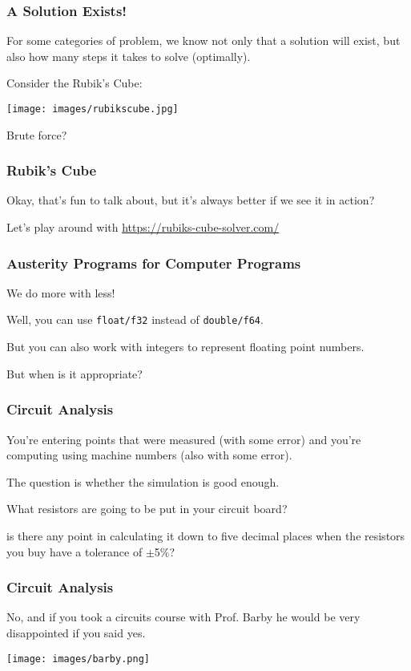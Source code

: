 \begin{frame}
\frametitle{A Solution Exists!}

For some categories of problem, we know not only that a solution will exist, but also how many steps it takes to solve (optimally). 

Consider the Rubik's Cube:

\begin{center}
	\texttt{[image: images/rubikscube.jpg]}
\end{center}

Brute force?

\end{frame}


\begin{frame}
\frametitle{Rubik's Cube}

Okay, that's fun to talk about, but it's always better if we see it in action? 

Let's play around with \url{https://rubiks-cube-solver.com/}

\end{frame}



\begin{frame}
\frametitle{Austerity Programs for Computer Programs}

We do more with less! 

Well, you can use \texttt{float/f32} instead of \texttt{double/f64}. 

But you can also work with integers to represent floating point numbers.

But when is it appropriate?


\end{frame}


\begin{frame}
\frametitle{Circuit Analysis}

You're entering points that were measured (with some error) and you're computing using machine numbers (also with some error).

The question is whether the simulation is good enough.

What resistors are going to be put in your circuit board?

is there any point in calculating it down to five decimal places when the resistors you buy have a tolerance of $\pm$5\%? 

\end{frame}


\begin{frame}
\frametitle{Circuit Analysis}


No, and if you took a circuits course with Prof. Barby he would be very disappointed if you said yes.

\begin{center}
	\texttt{[image: images/barby.png]}
\end{center}

\end{frame}


